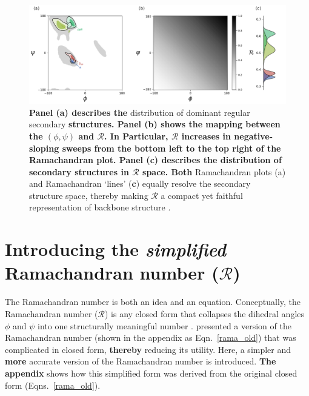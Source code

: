 \documentclass[fleqn,10pt,lineno]{wlpeerj} %
\newcommand{\Eqn}[1]{Eqn.~\ref{#1}}
\newcommand{\Eqns}[1]{Eqns.~\ref{#1}}
\newcommand{\n}[1]{{\textbf{\color{red}#1}}}
\newcommand{\rr}{$\mathcal{R}$\xspace}
\begin{document}
\begin{figure}[t!]
\begin{adjustwidth}{-1in}{0in} %
\centering
\includegraphics[width=0.9\linewidth]{automated_figures/fig_ss_2d_1d.pdf}
\caption{\n{Panel (a) describes the } distribution of dominant regular secondary \n{structures. Panel (b) shows the mapping between the $(\phi,\psi)$ and \rr. In Particular, \rr increases in negative-sloping sweeps from the bottom left to the top right of the Ramachandran plot. Panel (c) describes the distribution of secondary structures in \rr space. Both} Ramachandran plots (a) and Ramachandran `lines' (\n{c}) equally resolve the secondary structure space, thereby making \rr a compact yet faithful representation of backbone structure \citep{Mannige2016}.\label{fig:ramasecondary}} 
\end{adjustwidth}
\end{figure}

\section*{Introducing the \textit{simplified} Ramachandran number ($\mathcal{R}$)}

The Ramachandran number is both an idea and an equation. Conceptually, 
the Ramachandran number ($\mathcal{R}$) is any closed form that 
collapses the dihedral angles $\phi$ and $\psi$ into one structurally 
meaningful number \citep{Mannige2016}. \cite{Mannige2016} presented a 
version of the Ramachandran number (shown in the appendix as \Eqn{rama_old}) that was complicated in closed form, \n{thereby} reducing its utility. Here, a simpler and \n{more} accurate version of the Ramachandran number is introduced. \n{The appendix} shows how this simplified form was derived from the original closed form (\Eqns{rama_old}).
\end{document}
